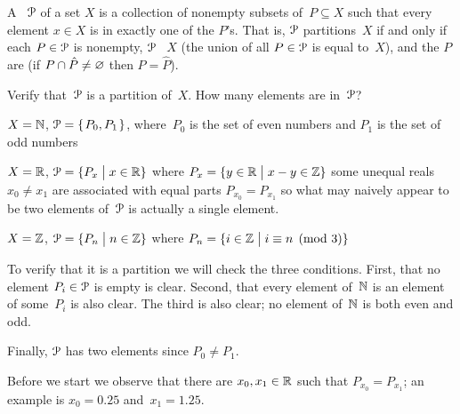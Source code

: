 \documentclass{ibl}  %
\begin{document}
\begin{df}
A ~$\EuScript{P}$ of a set $X$ is a 
collection of nonempty subsets of~$P\subseteq X$ such that every 
element $x\in X$ is in exactly one of the $P$'s.
That is, $\EuScript{P}$ partitions~$X$ if and only if each
$P\in\EuScript{P}$ is nonempty,
$\EuScript{P}$ ~$X$
(the union of all $P\in\EuScript{P}$ is equal to~$X$),
and the $P$ are 
(if $P\cap \hat{P}\neq\varnothing$ then $P=\hat{P}$).
\end{df}

\begin{center}
\end{center}

\begin{ex} Verify that~$\EuScript{P}$ is a partition of~$X$.  
  How many elements are in~$\EuScript{P}$?
\begin{exes}
\item $X=\mathbb{N}$, $\EuScript{P}=\mbox{$\{\hspace{0.1em}P_0,P_1\hspace{0.1em}\}$}$, 
  where~$P_0$ is the set of even numbers
  and $P_1$ is the set of odd numbers
\item $X=\mathbb{R}$, $\EuScript{P}=\{P_x \bigm| x\in \mathbb{R}\}$
      where $P_x=\{y\in\mathbb{R} \bigm| x-y\in \mathbb{Z}\}$
      \hspace{0.75em}\hint some unequal reals $x_0\neq x_1$ 
      are associated with equal parts $P_{x_0}=P_{x_1}$  
      so what may naively appear to be two elements of~$\EuScript{P}$
      is actually a single element.
\item $X=\mathbb{Z}$, $\EuScript{P}=\{P_n \bigm| n\in\mathbb{Z}\}$
      where $P_n=\{i\in\mathbb{Z} \bigm| i\equiv n\pmod 3\}$
\end{exes}
\begin{ans}
\begin{exes}
\item To verify that it is a partition we will check the three conditions.
  First, that no element $P_i\in \EuScript{P}$ is empty is clear.
  Second, that every element of~$\mathbb{N}$ is an element of some~$P_i$ is
  also clear.
  The third is also clear; no element of~$\mathbb{N}$ is both even and odd.

  Finally, $\EuScript{P}$ has two elements since $P_0\neq P_1$.
\item Before we start we observe that there are $x_0,x_1\in\mathbb{R}$ such that
  $P_{x_0}=P_{x_1}$; an example is $x_0=0.25$ and~$x_1=1.25$.


\end{exes}
\end{ans}
\end{ex}
\end{document}
